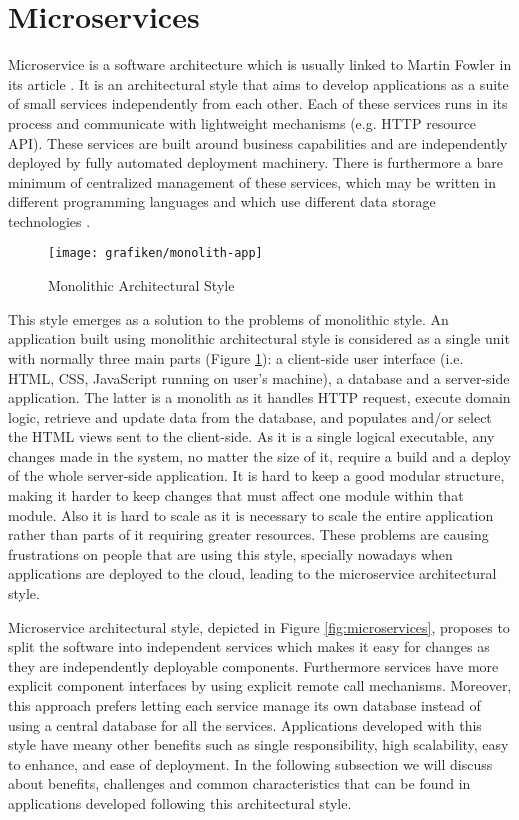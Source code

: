 \section{Microservices}
Microservice is a software architecture which is usually linked to Martin Fowler in its article \cite{Fowler2014}. It is an architectural style that aims to develop applications as a suite of small services independently from each other. Each of these services runs in its process and communicate with lightweight mechanisms (e.g. HTTP resource API). These services are built around business capabilities and are independently deployed by fully automated deployment machinery. There is furthermore a bare minimum of centralized management of these services, which may be written in different programming languages and which use different data storage technologies \cite{Fowler2014}.

\begin{figure}[htb]
	\centering
    \texttt{[image: grafiken/monolith-app]}
    \caption{Monolithic Architectural Style}
    \label{fig:monolith}
\end{figure}

This style emerges as a solution to the problems of monolithic style. An application built using monolithic architectural style is considered as a single unit with normally three main parts (Figure \ref{fig:monolith}): a client-side user interface (i.e. HTML, CSS, JavaScript running on user's machine), a database and a server-side application. The latter is a monolith as it handles HTTP request, execute domain logic, retrieve and update data from the database, and populates and/or select the HTML views sent to the client-side. As it is a single logical executable, any changes made in the system, no matter the size of it, require a build and a deploy of the whole server-side application. It is hard to keep a good modular structure, making it harder to keep changes that must affect one module within that module. Also it is hard to scale as it is necessary to scale the entire application rather than parts of it requiring greater resources. These problems are causing frustrations on people that are using this style, specially nowadays when applications are deployed to the cloud, leading to the microservice architectural style.

Microservice architectural style, depicted in Figure \ref{fig:microservices}, proposes to split the software into independent services which makes it easy for changes as they are independently deployable components. Furthermore services have more explicit component interfaces by using explicit remote call mechanisms. Moreover, this approach prefers letting each service manage its own database instead of using a central database for all the services. Applications developed with this style have meany other benefits such as single responsibility, high scalability, easy to enhance, and ease of deployment. In the following subsection we will discuss about benefits, challenges and common characteristics that can be found in applications developed following this architectural style.


